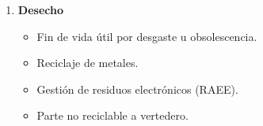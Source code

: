 \begin{solution}
\begin{enumerate}
    \item \textbf{Desecho}
    \begin{itemize}
        \item Fin de vida útil por desgaste u obsolescencia.
        \item Reciclaje de metales.
        \item Gestión de residuos electrónicos (RAEE).
        \item Parte no reciclable a vertedero.
    \end{itemize}
\end{enumerate}
\end{solution}

